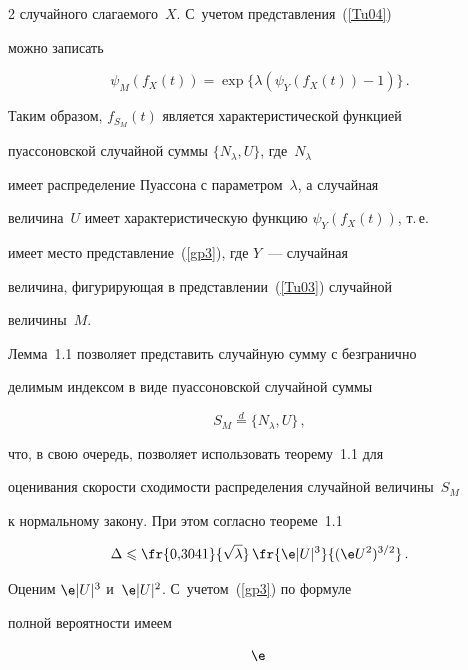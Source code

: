 \begin{multicols}{2}
случайного слагаемого~$X$. С~учетом представления~(\ref{Tu04})


можно записать


$$


\psi_M(f_X(t))=\exp\{\lambda(\psi_Y(f_X(t))-1)\}\,.


$$


Таким образом, $f_{S_{M}}(t)$ является характеристической функцией


пуассоновской случайной суммы $\{N_\lambda,U\}$, где~$N_\lambda$


имеет распределение Пуассона с параметром~$\lambda$, а случайная


величина~$U$ имеет характеристическую функцию $\psi_Y(f_X(t))$, т.\,е.\


 имеет место представление~(\ref{gp3}), где $Y$~--- случайная


величина, фигурирующая в представлении~(\ref{Tu03}) случайной


величины~$M$.





\medskip








Лемма~1.1 позволяет представить случайную сумму с безгранично


делимым индексом в виде пуассоновской случайной суммы


$$


S_M\stackrel{d}{=}\{N_\lambda,U\}\,,


$$


что, в свою очередь, позволяет использовать теорему~1.1 для


оценивания скорости сходимости распределения случайной величины~$S_M$ 


к нормальному закону. При этом согласно теореме~1.1


$$


\Delta\leqslant \fr{0{,}3041}{\sqrt{\lambda}}\,\fr{\e


|U|^3}{(\e U^2)^{3/2}}\,.


$$





Оценим $\e |U|^3$ и~$\e |U|^2$. С~учетом~(\ref{gp3}) по формуле


полной вероятности имеем


\begin{equation}


\! \e



\end{equation}
\end{multicols}
